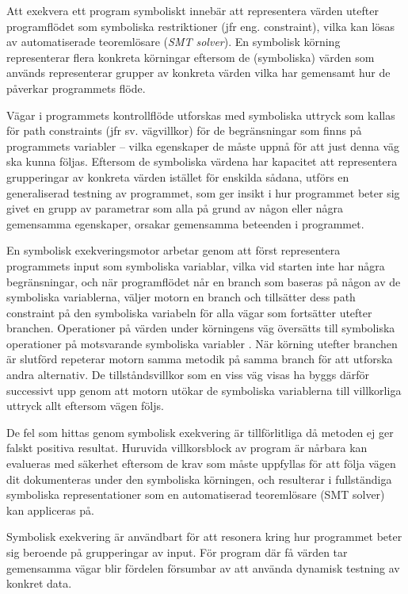 Att exekvera ett program symboliskt innebär att representera värden utefter 
programflödet som symboliska restriktioner (jfr eng. constraint), vilka kan lösas av automatiserade 
teoremlösare (\emph{SMT solver}). En symbolisk körning representerar flera konkreta 
körningar eftersom de (symboliska) värden som används representerar grupper av 
konkreta värden vilka har gemensamt hur de påverkar programmets flöde. 

Vägar i programmets kontrollflöde utforskas med symboliska uttryck som kallas
för path constraints (jfr sv. vägvillkor) för de begränsningar som finns på
programmets variabler -- vilka egenskaper de måste uppnå för att just denna väg
ska kunna följas. Eftersom de symboliska värdena har kapacitet att representera
grupperingar av konkreta värden istället för enskilda sådana, utförs en
generaliserad testning av programmet, som ger insikt i hur programmet beter sig
givet en grupp av parametrar som alla på grund av någon eller några gemensamma
egenskaper, orsakar gemensamma beteenden i programmet. 

En symbolisk exekveringsmotor arbetar genom att först representera programmets
input som symboliska variablar, vilka vid starten inte har några begränsningar,
och när programflödet når en branch som baseras på någon av de symboliska
variablerna, väljer motorn en branch och tillsätter dess path constraint på den
symboliska variabeln för alla vägar som fortsätter utefter branchen. Operationer
på värden under körningens väg översätts till symboliska operationer på
motsvarande symboliska variabler \cite{klee}. När körning utefter branchen är
slutförd repeterar motorn samma metodik på samma branch för att utforska andra
alternativ. De tillståndsvillkor som en viss väg visas ha byggs därför
successivt upp genom att motorn utökar de symboliska variablerna till
villkorliga uttryck allt eftersom vägen följs. 

De fel som hittas genom symbolisk exekvering är tillförlitliga då metoden ej ger falskt 
positiva resultat. Huruvida villkorsblock av program är nårbara kan evalueras med 
säkerhet eftersom de krav som måste uppfyllas för att följa vägen dit dokumenteras under 
den symboliska körningen, och resulterar i fullständiga symboliska representationer 
som en automatiserad teoremlösare (SMT solver) kan appliceras på. 

Symbolisk exekvering är användbart för att resonera kring hur programmet beter sig 
beroende på grupperingar av input. För program där få värden tar gemensamma vägar blir 
fördelen försumbar av att använda dynamisk testning av konkret data. 

